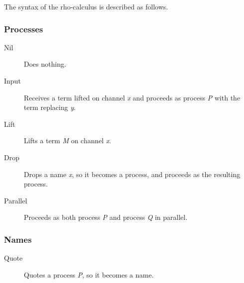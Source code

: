 The syntax of the rho-calculus is described as follows.

\subsubsection{Processes}
\begin{description}
\item[Nil] Does nothing.
\item[Input] Receives a term lifted on channel \textit{x} and proceeds as process \textit{P} with the term replacing \textit{y}.
\item[Lift] Lifts a term \textit{M} on channel \textit{x}.
\item[Drop] Drops a name \textit{x}, so it becomes a process, and proceeds as the resulting process.
\item[Parallel] Proceeds as both process \textit{P} and process \textit{Q} in parallel.
\end{description}


\subsubsection{Names}
\begin{description}
\item[Quote] Quotes a process \textit{P}, so it becomes a name.
\end{description}


